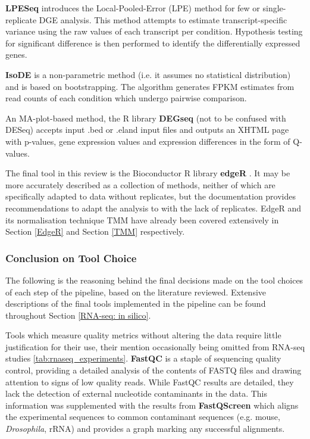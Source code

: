 \textbf{LPESeq} \citep{gim2016lpeseq} introduces the Local-Pooled-Error (LPE) method for few or single-replicate \ac{DGE} analysis. This method attempts to estimate transcript-specific variance using the raw values of each transcript per condition. Hypothesis testing for significant difference is then performed to identify the differentially expressed genes.

\textbf{IsoDE} \citep{al2014bootstrap} is a non-parametric method (i.e. it assumes no statistical distribution) and is based on bootstrapping. The algorithm generates FPKM estimates from read counts of each condition which undergo pairwise comparison.

An MA-plot-based method, the R library \textbf{DEGseq} \citep{wang2010degseq} (not to be confused with DESeq) accepts input .bed or .eland input files and outputs an XHTML page with p-values, gene expression values and expression differences in the form of Q-values.

The final tool in this review is the Bioconductor R library \textbf{edgeR} \citep{edger}. It may be more accurately described as a collection of methods, neither of which are specifically adapted to data without replicates, but the documentation provides recommendations to adapt the analysis to with the lack of replicates. EdgeR and its normalisation technique TMM have already been covered extensively in Section \ref{EdgeR} and Section \ref{TMM} respectively. 


\subsubsection{Conclusion on Tool Choice}
The following is the reasoning behind the final decisions made on the tool choices of each step of the pipeline, based on the literature reviewed. Extensive descriptions of the final tools implemented in the pipeline can be found throughout Section \ref{RNA-seq: in silico}.

Tools which measure quality metrics without altering the data require little justification for their use, their mention occasionally being omitted from RNA-seq studies \autoref{tab:rnaseq_experiments}. \textbf{FastQC} is a staple of sequencing quality control, providing a detailed analysis of the contents of FASTQ files and drawing attention to signs of low quality reads. While FastQC results are detailed, they lack the detection of external nucleotide contaminants in the data. This information was supplemented with the results from \textbf{FastQScreen} which aligns the experimental sequences to common contaminant sequences (e.g. mouse, \textit{Drosophila}, rRNA) and provides a graph marking any successful alignments.

